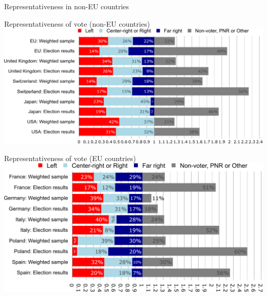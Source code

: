 \documentclass[aspectratio=169,xcolor=dvipsnames, 11pt,mathserif]{beamer}
\begin{document}
\begin{frame}{Representativeness in non-EU countries \hyperlink{data}{} \label{representativeness}}
    \vspace{-.6cm}
    \begin{table}[h]
        \makebox[\textwidth][c]{
            \resizebox*{!}{.97\textheight}{
            
            }
        }
    \end{table}  
\end{frame}

\begin{frame}{Representativeness of vote (non-EU countries)  \hyperlink{data}{}}
\includegraphics[height=.95\textheight]{../figures/country_comparison/vote_non_EU_pnr_out.pdf}
\end{frame}

\begin{frame}{Representativeness of vote (EU countries)  \hyperlink{data}{}}
\includegraphics[height=.95\textheight]{../figures/country_comparison/vote_EU_pnr_out.pdf}
\end{frame}
\end{document}
